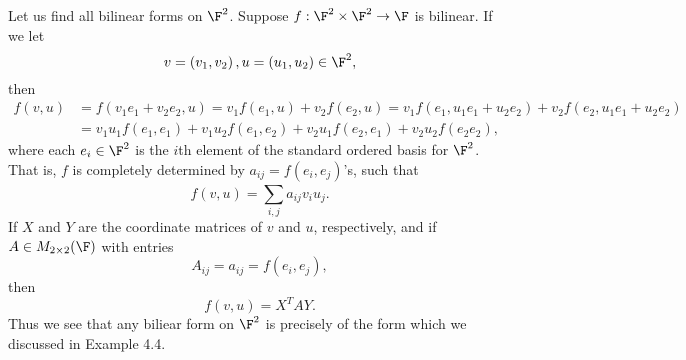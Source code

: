 \documentclass[math_245.tex]{subfiles}
\begin{document}
    \begin{example}
        Let us find all bilinear forms on $\F^2$. Suppose $f:\F^2\times\F^2\to\F$ is bilinear. If we let
        \begin{equation*}
            v = \left( v_1,v_2 \right) , u = \left( u_1,u_2 \right) \in\F^2,
        \end{equation*}
        then
        \begin{align*}
            f(v,u) & = f\left( v_1e_1+v_2e_2, u \right) = v_1f\left( e_1,u \right) + v_2f\left( e_2,u \right) = v_1f\left( e_1,u_1e_1+u_2e_2 \right) + v_2f\left( e_2,u_1e_1+u_2e_2 \right) \\
                   & = v_1u_1f\left( e_1,e_1 \right) + v_1u_2f\left( e_1,e_2 \right) + v_2u_1f\left( e_2,e_1 \right) + v_2u_2f\left( e_2e_2 \right) ,
        \end{align*} 
        where each $e_i\in\F^2$ is the $i$th element of the standard ordered basis for $\F^2$. That is, $f$ is completely determined by $a_{ij}=f(e_i,e_j)$'s, such that
        \begin{equation*}
            f(v,u) = \sum^{}_{i,j} a_{ij}v_iu_j.
        \end{equation*}
        If $X$ and $Y$ are the coordinate matrices of $v$ and $u$, respectively, and if $A\in M_{2\times 2}(\F)$ with entries
        \begin{equation*}
            A_{ij} = a_{ij} = f\left( e_i,e_j \right) ,
        \end{equation*}
        then
        \begin{equation*}
            f(v,u) = X^TAY.
        \end{equation*}
        Thus we see that any biliear form on $\F^2$ is precisely of the form which we discussed in Example 4.4.
    \end{example}
\end{document}

